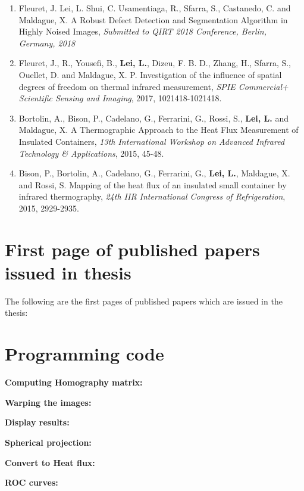 \begin{enumerate}
        \item Fleuret, J. Lei, L. Shui, C. Usamentiaga, R., Sfarra, S., Castanedo, C. and Maldague, X.
        A Robust Defect Detection and Segmentation Algorithm in Highly Noised Images, \textit{Submitted to QIRT 2018 Conference, Berlin, Germany, 2018}

        \item Fleuret, J., R., Yousefi, B., \textbf{Lei, L.}, Dizeu, F. B. D., Zhang, H., Sfarra, S., Ouellet, D. and Maldague, X. P. 
        Investigation of the influence of spatial degrees of freedom on thermal infrared measurement, \textit{SPIE Commercial+ Scientific Sensing and Imaging}, 2017, 1021418-1021418.

        \item Bortolin, A., Bison, P., Cadelano, G., Ferrarini, G., Rossi, S., \textbf{Lei, L.} and Maldague, X. 
        A Thermographic Approach to the Heat Flux Measurement of Insulated Containers, \textit{13th International Workshop on Advanced Infrared Technology \& Applications}, 2015, 45-48.

        \item Bison, P., Bortolin, A., Cadelano, G., Ferrarini, G., \textbf{Lei, L.}, Maldague, X. and Rossi, S. 
        Mapping of the heat flux of an insulated small container by infrared thermography, \textit{24th IIR International Congress of Refrigeration}, 2015, 2929-2935.

    \end{enumerate}



\bigskip
\section*{First page of published papers issued in thesis}
The following are the first pages of published papers which are issued in the thesis:




\section*{Programming code}

\textbf{Computing Homography matrix:}


\textbf{Warping the images:}


\textbf{Display results:}



\textbf{Spherical projection:}


\textbf{Convert to Heat flux:}


\textbf{ROC curves:}

